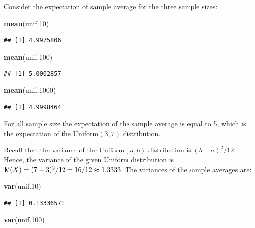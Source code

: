 \documentclass[]{krantz}
\makeatletter
\newenvironment{Shaded}{\begin{snugshade}}{\end{snugshade}}
\newcommand{\KeywordTok}[1]{\textcolor[rgb]{0.13,0.29,0.53}{\textbf{#1}}}
\newcommand{\DecValTok}[1]{\textcolor[rgb]{0.00,0.00,0.81}{#1}}
\newcommand{\NormalTok}[1]{#1}
\newcommand{\Var}{{\rm I\kern-.3em V}}
\newenvironment{kframe}{%
\medskip{}
\setlength{\fboxsep}{.8em}
 \def\at@end@of@kframe{}%
 \ifinner\ifhmode%
  \def\at@end@of@kframe{\end{minipage}}%
  \begin{minipage}{\columnwidth}%
 \fi\fi%
 \def\FrameCommand##1{\hskip\@totalleftmargin \hskip-\fboxsep
 \colorbox{shadecolor}{##1}\hskip-\fboxsep
     \hskip-\linewidth \hskip-\@totalleftmargin \hskip\columnwidth}%
 \MakeFramed {\advance\hsize-\width
   \@totalleftmargin\z@ \linewidth\hsize
   \@setminipage}}%
 {\par\unskip\endMakeFramed%
 \at@end@of@kframe}
\renewenvironment{Shaded}{\begin{kframe}}{\end{kframe}}
\theoremstyle{definition}
\theoremstyle{definition}
\theoremstyle{definition}
\theoremstyle{remark}
\makeatother
\begin{document}
Consider the expectation of sample average for the three sample sizes:

\begin{Shaded}
\begin{Highlighting}[]
\KeywordTok{mean}\NormalTok{(unif.}\DecValTok{10}\NormalTok{)}
\end{Highlighting}
\end{Shaded}

\begin{verbatim}
## [1] 4.9975806
\end{verbatim}

\begin{Shaded}
\begin{Highlighting}[]
\KeywordTok{mean}\NormalTok{(unif.}\DecValTok{100}\NormalTok{)}
\end{Highlighting}
\end{Shaded}

\begin{verbatim}
## [1] 5.0002857
\end{verbatim}

\begin{Shaded}
\begin{Highlighting}[]
\KeywordTok{mean}\NormalTok{(unif.}\DecValTok{1000}\NormalTok{)}
\end{Highlighting}
\end{Shaded}

\begin{verbatim}
## [1] 4.9998464
\end{verbatim}

For all sample size the expectation of the sample average is equal to 5,
which is the expectation of the \(\mathrm{Uniform}(3,7)\) distribution.

Recall that the variance of the \(\mathrm{Uniform}(a,b)\) distribution
is \((b-a)^2/12\). Hence, the variance of the given Uniform distribution
is \(\Var(X) = (7-3)^2/12 = 16/12 \approx 1.3333\). The variances of the
sample averages are:

\begin{Shaded}
\begin{Highlighting}[]
\KeywordTok{var}\NormalTok{(unif.}\DecValTok{10}\NormalTok{)}
\end{Highlighting}
\end{Shaded}

\begin{verbatim}
## [1] 0.13336571
\end{verbatim}

\begin{Shaded}
\begin{Highlighting}[]
\KeywordTok{var}\NormalTok{(unif.}\DecValTok{100}\NormalTok{)}
\end{Highlighting}
\end{Shaded}
\end{document}
